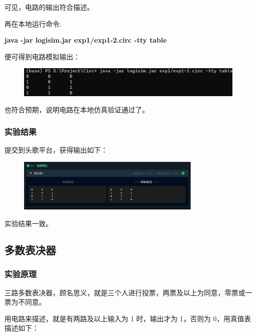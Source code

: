 \documentclass[UTF8]{ctexart}
\begin{document}
可见，电路的输出符合描述。

再在本地运行命令:

\begin{center}
    \textbf{java -jar logisim.jar exp1/exp1-2.circ -tty table}
\end{center}

便可得到电路模拟输出：

\begin{figure}[H]
    \centering
    \includegraphics[width = \textwidth]{images/native2.jpg}
\end{figure}

也符合预期，说明电路在本地仿真验证通过了。



\subsubsection{实验结果}

提交到头歌平台，获得输出如下：

\begin{figure}[H]
    \centering
    \includegraphics[width = 0.8\textwidth]{images/test2.jpg}
\end{figure}

实验结果一致。


\subsection{多数表决器}

\subsubsection{实验原理}

三路多数表决器，顾名思义，就是三个人进行投票，两票及以上为同意，零票或一票为不同意。

用电路来描述，就是有两路及以上输入为 1 时，输出才为 1，否则为 0，用真值表描述如下：
\end{document}
